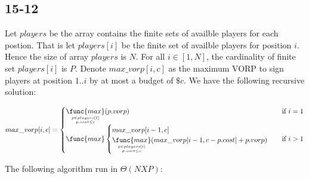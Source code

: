 \subsection*{15-12}

Let $players$ be the array contains the finite sets of availble players 
for each postion.
That is let $players[i]$ be the finite set of availble players for position $i$.
Hence the size of array $players$ is $N$.
For all $i \in [1,N]$, the cardinality of finite set $players[i]$ is $P$.
Denote $max\_vorp[i,c]$ as the maximum VORP to sign players
at position $1 .. i$ by at most a budget of $\$c$.
We have the following recursive solution:

\begin{equation*}
    max\_vorp[i,c] = 
    \begin{cases}
        \mathop{\func{max}}\limits_{p \in players[1] \atop p.cost \leq c}
        (p.vorp) 
            & \text{if } i = 1 \\
        \func{max}
        \begin{cases}
            max\_vorp[i-1,c] \\
            \mathop{\func{max}}\limits_{p \in players[i] \atop p.cost \leq c}
            (max\_vorp[i-1,c-p.cost] + p.vorp)
        \end{cases}
            & \text{if } i > 1
    \end{cases}
\end{equation*}

The following algorithm run in $\Theta(NXP)$:

